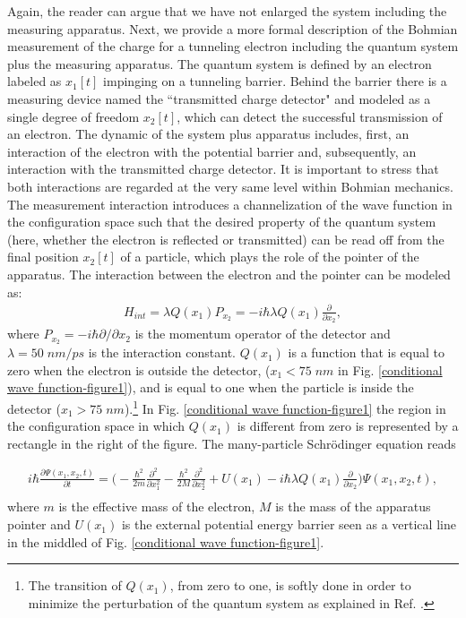 \documentclass[nofootinbib, secnumarabic, amsmath, nobibnotes,10pt,aps,pra]{revtex4-1}
\newcommand{\fref}[1]{Fig. \ref{#1}}
\begin{document}
Again, the reader can argue that we have not enlarged the system including the measuring apparatus. Next, we provide a more formal description of the Bohmian measurement of the  charge for a tunneling electron including the quantum system plus the measuring apparatus.  The quantum system is defined by an electron labeled as $x_1[t]$ impinging on a
 tunneling barrier. Behind the barrier there is a measuring device named the ``transmitted charge detector" and modeled as a single degree of freedom $x_2[t]$, which can detect the successful transmission of an electron. The dynamic of the system plus apparatus includes, first, an interaction of the electron with the potential barrier and, subsequently, an interaction with the transmitted charge detector. It is important to stress that both interactions are regarded at the very same level within Bohmian mechanics. The measurement interaction introduces a channelization of the wave function in the configuration space such that the desired property of the quantum system (here, whether the electron is reflected or transmitted) can be read off from the final position $x_2[t]$ of a particle, which plays the role of the pointer of the apparatus. 
The interaction between the electron and the pointer can be modeled as:
\begin{eqnarray}
H_{int}= \lambda Q(x_1) P_{x_2} = -i \hbar\lambda Q(x_1) \frac {\partial } {\partial x_2},
\label{eq-interaction2} 
\end{eqnarray}
where $P_{x_2} = -i\hbar \partial /\partial x_2 $ is the momentum operator of the detector and $\lambda =50\; nm/ps $ is the interaction constant. $Q(x_1)$ is a function that is equal to zero when the electron is outside the detector, ($x_1 < 75 \; nm$ in \fref{conditional wave function-figure1}), and is equal to one when the particle is inside the detector ($x_1 > 75 \; nm$).\footnote{The transition of $Q(x_1)$, from zero to one, is softly done in order to minimize the perturbation of the quantum system as explained in Ref. \cite{om.albareda,om.2marian}.}  In \fref{conditional wave function-figure1} the region in the configuration space in which $Q(x_1)$ is different from zero is represented by a rectangle in the right of the figure.
The many-particle Schr\"odinger equation reads

\begin{eqnarray}
 i \hbar \frac{\partial \Psi(x_1,x_2,t)}{\partial t}=
 \Big(- \frac{\hbar^2}{2m}\frac {\partial^2} {\partial x_1^2}  - \frac{\hbar^2}{2 M}\frac {\partial^2} {\partial x_2^2}   
 + U(x_1) - i \hbar \lambda Q(x_1) \frac {\partial} {\partial x_2}\Big) \Psi(x_1,x_2,t), \nonumber\\
\label{eq-schr2D}
\end{eqnarray}
where $m$ is the effective mass of the electron, $M$ is the mass of
the apparatus pointer and $U(x_1)$ is the external potential energy barrier seen as a vertical line in the middled of \fref{conditional wave function-figure1}.
\end{document}
